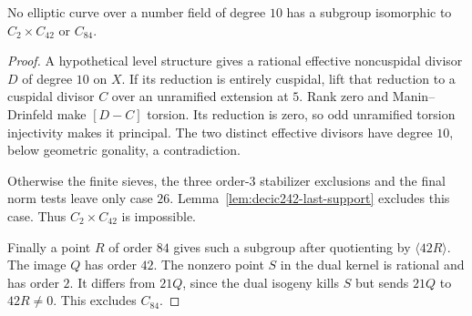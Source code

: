 


\begin{proposition}\label{prop:decic242-excluded}
No elliptic curve over a number field of degree $10$ has a
subgroup isomorphic to $C_2\times C_{42}$ or $C_{84}$.
\end{proposition}
\begin{proof}
A hypothetical level structure gives a rational effective
noncuspidal divisor $D$ of degree $10$ on $X$.
If its reduction is entirely cuspidal, lift that reduction to a
cuspidal divisor $C$ over an unramified extension at $5$.
Rank zero and Manin--Drinfeld make $[D-C]$ torsion.
Its reduction is zero, so odd unramified torsion injectivity makes
it principal. The two distinct effective divisors have degree
$10$, below geometric gonality, a contradiction.

Otherwise the finite sieves, the three order-$3$ stabilizer
exclusions and the final norm tests leave only case $26$.
Lemma~\ref{lem:decic242-last-support} excludes this case.
Thus $C_2\times C_{42}$ is impossible.

Finally a point $R$ of order $84$ gives such a subgroup after
quotienting by $\langle42R\rangle$.
The image $Q$ has order $42$.
The nonzero point $S$ in the dual kernel is rational and has
order $2$. It differs from $21Q$, since the dual isogeny kills
$S$ but sends $21Q$ to $42R\ne0$.
This excludes $C_{84}$.
\end{proof}
